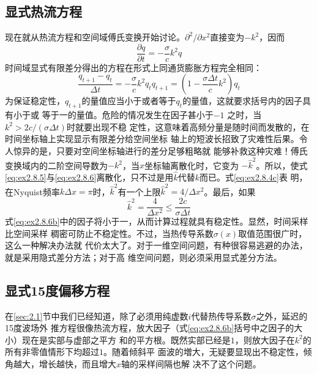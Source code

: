 \subsection{显式热流方程}
\label{sec:2.8.1}

现在就从热流方程和空间域傅氏变换开始讨论。$\partial^2/\partial x^2$直接变为$-k^2$，因而
\begin{equation}
\frac{\partial q}{\partial t}=-\frac{\sigma}{c}k^2q
\label{eq:ex2.8.5}
\end{equation}
时间域显式有限差分得出的方程在形式上同通货膨胀方程完全相同：
\begin{subequations}
  \begin{equation}
  \frac{q_{t+1}-q_t}{\Delta t}=-\frac{\sigma}{c}k^2q_t
  \label{eq:ex2.8.6a}
  \end{equation}
  \begin{equation}
  q_{t+1}=(1-\frac{\sigma\Delta t}{c}k^2)q_t
  \label{eq:ex2.8.6b}
  \end{equation}
\label{eq:ex2.8.6}
\end{subequations}
为保证稳定性，$q_{t+1}$的量值应当小于或者等于$q_t$的量值，这就要求括号内的因子具有小于或
等于一的量值。危险的情况发生在因子甚小于$-1$
之时，当$k^2>2c/(\sigma\Delta t)$时就要出现不稳
定性，这意味着高频分量是随时间而发散的，在时间坐标轴上实现显示有限差分给空间坐标
轴上的短波长招致了灾难性后果。令人惊异的是，只要对空间坐标轴进行的差分足够粗略就
能够补救这种灾难！傅氏变换域内的二阶空间导数为$-k^2$，当$x$坐标轴离散化时，它变为
$-\hat{k}^2$。所以，使式\ref{eq:ex2.8.5}与\ref{eq:ex2.8.6}离散化，只不过是用$\hat{k}$代替$k$而已。式\ref{eq:ex2.8.4c}表
明，在Nyquist频率$k\Delta x=\pi$时，$\hat{k}^2$有一个上限$\hat{k}^2=4/\Delta x^2$。最后，如果
\begin{equation}
\hat{k}^2=\frac{4}{\Delta x^2}\leq\frac{2c}{\sigma\Delta t}
\label{eq:ex2.8.7}
\end{equation}
式\ref{eq:ex2.8.6b}中的因子将小于一，从而计算过程就具有稳定性。显然，时间采样比空间采样
稠密可防止不稳定性。不过，当热传导系数$\sigma(x)$取值范围很广时，这么一种解决办法就
代价太大了。对于一维空间问题，有种很容易逃避的办法，就是采用隐式差分方法；对于高
维空间问题，则必须采用显式差分方法。

\subsection{显式15度偏移方程}
\label{sec:2.8.2}

在\ref{sec:2.1}节中我们已经知道，除了必须用纯虚数$i$代替热传导系数$\sigma$之外，延迟的15度波场外
推方程很像热流方程，放大因子（式\ref{eq:ex2.8.6b}括号中之因子的大小）现在是实部与虚部之平方
和的平方根。既然实部已经是$1$，则放大因子在$k^2$的所有非零值情形下均超过$1$。随着倾斜平
面波的増大，无疑要显现出不稳定性，倾角越大，增长越快，而且增大$x$轴的采样间隔也解
决不了这个问题。

